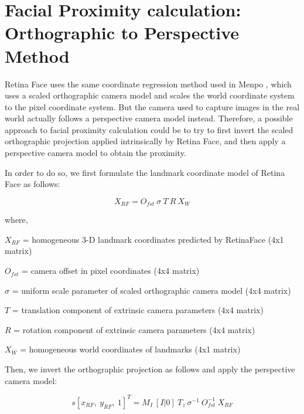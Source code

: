 \documentclass[twoside]{iitbreport}
\begin{document}
\appendix
\chapter{Facial Proximity calculation: Orthographic to Perspective Method}
Retina Face uses the same coordinate regression method used in Menpo \citep{menpo}, which uses a scaled orthographic camera model and scales the world coordinate system to the pixel coordinate system. But the camera used to capture images in the real world actually follows a perspective camera model instead. Therefore, a possible approach to facial proximity calculation could be to try to first invert the scaled orthographic projection applied intrinsically by Retina Face, and then apply a perspective camera model to obtain the proximity.

In order to do so, we first formulate the landmark coordinate model of Retina Face as follows:

\begin{equation}
\label{eq:retinaFaceModel}
X_{RF} = O_{fst} ~\sigma ~T ~R ~X_W
\end{equation}

where, 

\qquad $X_{RF}$ = homogeneous 3-D landmark coordinates predicted by RetinaFace (4x1 matrix)

\qquad $O_{fst}$ = camera offset in pixel coordinates (4x4 matrix)

\qquad $\sigma$ = uniform scale parameter of scaled orthographic camera model (4x4 matrix)

\qquad $T$ = translation component of extrinsic camera parameters (4x4 matrix)

\qquad $R$ = rotation component of extrinsic camera parameters (4x4 matrix)

\qquad $X_W$ = homogeneous world coordinates of landmarks (4x1 matrix)

Then, we invert the orthographic projection as follows and apply the perspective camera model:

\begin{equation}
\label{eq:ortho2perspective}
s [x_{RF},~y_{RF},~1]^T = M_I ~[I | 0] ~T_z ~\sigma^{-1} ~O_{fst}^{-1} ~X_{RF}
\end{equation}
\end{document}
